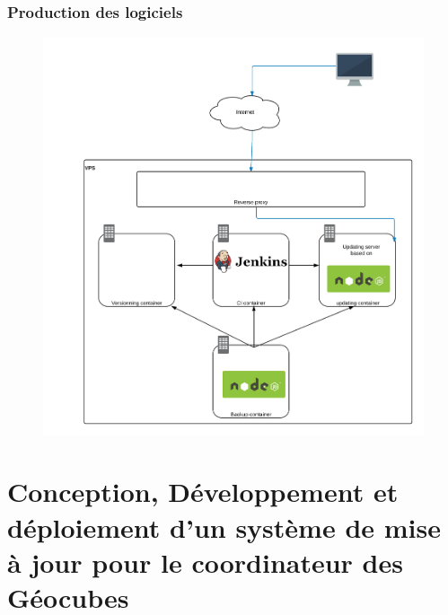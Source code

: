 \documentclass{beamer}
\begin{document}
\begin{frame}
\frametitle{Production des logiciels}
\begin{figure}
\centering
\includegraphics[scale=0.3]{images/vps1.png}
\end{figure}
\end{frame}

\section{Conception, Développement et déploiement d'un système de mise à jour pour le coordinateur des Géocubes}
\end{document}
